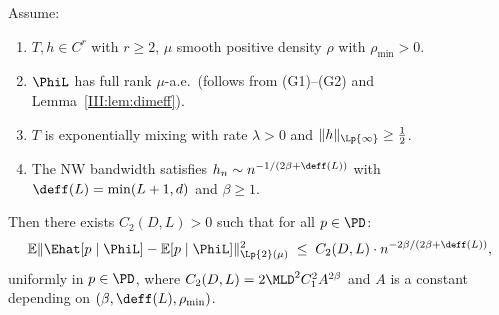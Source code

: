 \begin{proposition}
\label{III:prop:source2}
Assume:
\begin{enumerate}[label=(\roman*)]
  \item $T, h \in C^r$ with $r \geq 2$, $\mu$ smooth positive density $\rho$
        with $\rho_{\min} > 0$.
  \item $\PhiL$ has full rank $\mu$-a.e.\ (follows from (G1)--(G2) and
        Lemma~\ref{III:lem:dimeff}).
  \item $T$ is exponentially mixing with rate $\lambda > 0$ and
        $\|h\|_{\Lp{\infty}} \geq \frac{1}{2}$.
  \item The NW bandwidth satisfies $h_n \sim n^{-1/(2\beta+\deff(L))}$
        with $\deff(L) = \min(L+1, d)$ and $\beta \geq 1$.
\end{enumerate}
Then there exists $C_2(D,L) > 0$ such that for all $p \in \PD$:
\[
  \mathbb{E}\|\Ehat[p \mid \PhiL] - \mathbb{E}[p \mid \PhiL]\|_{\Lp{2}(\mu)}^2
  \;\leq\; C_2(D,L)\cdot n^{-2\beta/(2\beta+\deff(L))},
\]
uniformly in $p \in \PD$, where $C_2(D,L) = 2\MLD^2 C_1^2 A^{2\beta}$ and
$A$ is a constant depending on $(\beta, \deff(L), \rho_{\min})$.
\end{proposition}


